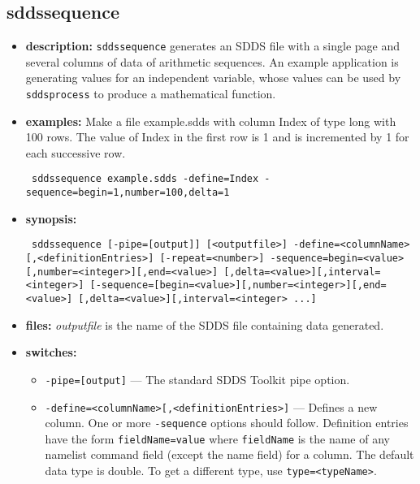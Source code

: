 \newpage
\subsection{sddssequence}
\label{sddssequence}

\begin{itemize}
\item {\bf description:} 
{\tt sddssequence} generates an SDDS file with a single page and several columns of data
of arithmetic sequences. An example application is 
generating values for an independent variable, whose values can be used by 
{\tt sddsprocess} to produce a mathematical function.
\item {\bf examples:} 
Make a file example.sdds with column Index of type long with 100 rows. The value of Index in the first row
is 1 and is incremented by 1 for each successive row.
\begin{flushleft}{\tt
sddssequence example.sdds -define=Index -sequence=begin=1,number=100,delta=1
}\end{flushleft}
\item {\bf synopsis:} 
\begin{flushleft}{\tt
sddssequence [-pipe=[output]] [<outputfile>]
-define=<columnName>[,<definitionEntries>] [-repeat=<number>]
-sequence=begin=<value>[,number=<integer>][,end=<value>]
    [,delta=<value>][,interval=<integer>]
[-sequence=[begin=<value>][,number=<integer>][,end=<value>]
    [,delta=<value>][,interval=<integer> ...]
}\end{flushleft}

\item {\bf files:}
{\em outputfile} is the name of the SDDS file containing data generated.

\item {\bf switches:}
    \begin{itemize}
    \item {\tt -pipe=[output]} --- The standard SDDS Toolkit pipe option.
    \item {\tt -define=<columnName>[,<definitionEntries>]} --- Defines a new column.
        One or more {\tt -sequence} options should follow. 
        Definition entries have the form {\tt fieldName=value}
        where {\tt fieldName} is the name of any namelist
        command field (except the name field) for a column. The default data type is double.
        To get a different type, use {\tt type=<typeName>}.


\end{itemize}
\end{itemize}
